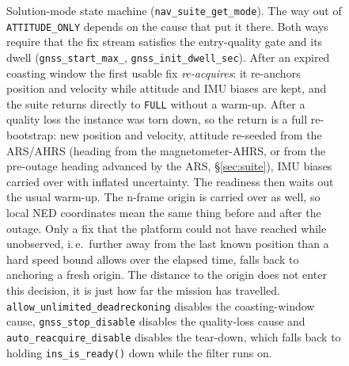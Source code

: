 \documentclass[11pt,a4paper]{article}
\newcommand{\code}[1]{\texttt{#1}}
\begin{document}
\begin{figure}[htbp]
\caption{Solution-mode state machine
(\code{nav\_\allowbreak{}suite\_\allowbreak{}get\_\allowbreak{}mode}). The way
out of \code{ATTITUDE\_\allowbreak{}ONLY} depends on the cause that put it
there. Both ways require that the fix stream satisfies the entry-quality gate
and its dwell (\code{gnss\_\allowbreak{}start\_\allowbreak{}max\_\allowbreak*},
\code{gnss\_\allowbreak{}init\_\allowbreak{}dwell\_\allowbreak{}sec}). After an
expired coasting window the first usable fix \emph{re-acquires}: it re-anchors
position and velocity while attitude and IMU biases are kept, and the suite
returns directly to \code{FULL} without a warm-up. After a quality loss the
instance was torn down, so the return is a full re-bootstrap: new position and
velocity, attitude re-seeded from the ARS/AHRS (heading from the
magnetometer-AHRS, or from the pre-outage heading advanced by the ARS,
\S\ref{sec:suite}), IMU biases carried over with inflated uncertainty. The
readiness then waits out the usual warm-up. The n-frame origin is carried over
as well, so local NED coordinates mean the same thing before and after the
outage. Only a fix that the platform could not have reached while unobserved,
i.\,e.\ further away from the last known position than a hard speed bound allows
over the elapsed time, falls back to anchoring a fresh origin. The distance to
the origin does not enter this decision, it is just how far the mission has
travelled.
\code{allow\_\allowbreak{}unlimited\_\allowbreak{}deadreckoning} disables the
coasting-window cause, \code{gnss\_\allowbreak{}stop\_\allowbreak{}disable}
disables the quality-loss cause and
\code{auto\_\allowbreak{}reacquire\_\allowbreak{}disable} disables the
tear-down, which falls back to holding
\code{ins\_\allowbreak{}is\_\allowbreak{}ready()} down while the filter runs
on.}
\label{fig:modes}
\end{figure}
\end{document}
